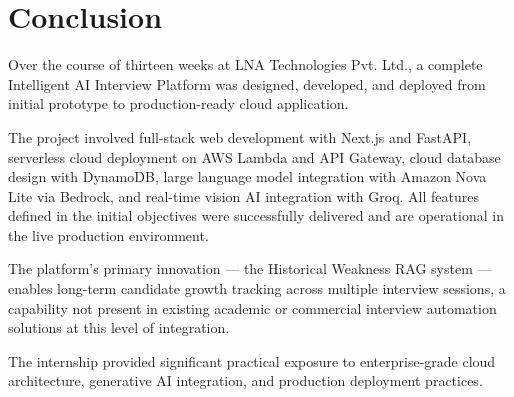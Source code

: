 \documentclass[12pt,a4paper]{article}
\begin{document}
\newpage

\section{Conclusion}

Over the course of thirteen weeks at LNA Technologies Pvt. Ltd., a complete Intelligent AI Interview Platform was designed, developed, and deployed from initial prototype to production-ready cloud application.

The project involved full-stack web development with Next.js and FastAPI, serverless cloud deployment on AWS Lambda and API Gateway, cloud database design with DynamoDB, large language model integration with Amazon Nova Lite via Bedrock, and real-time vision AI integration with Groq. All features defined in the initial objectives were successfully delivered and are operational in the live production environment.

The platform's primary innovation --- the Historical Weakness RAG system --- enables long-term candidate growth tracking across multiple interview sessions, a capability not present in existing academic or commercial interview automation solutions at this level of integration.

The internship provided significant practical exposure to enterprise-grade cloud architecture, generative AI integration, and production deployment practices.
\end{document}
